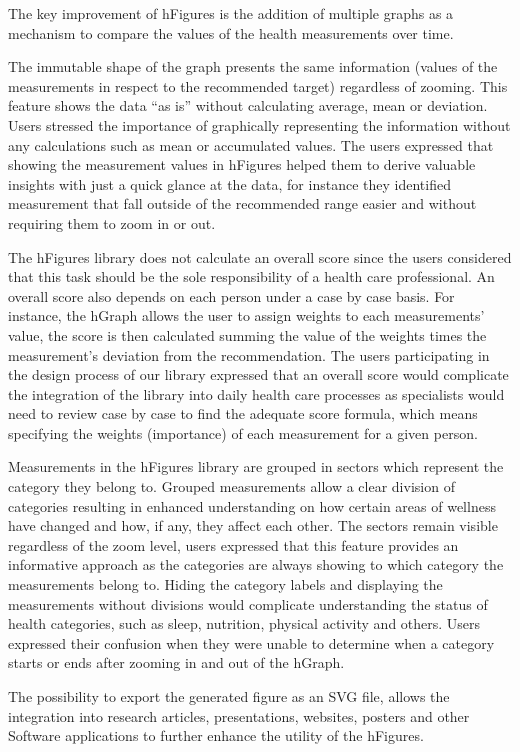 \documentclass[twocolumn]{bmcart}%
\providecommand{\DIFaddend}{} %
\begin{document}
\DIFaddend The key improvement of hFigures is the addition of multiple graphs as a mechanism to compare the values of the health measurements over time.

The immutable shape of the graph presents the same information (values of the measurements in respect to the recommended target) regardless of zooming. This feature shows the data ``as is'' without calculating average, mean or deviation. Users stressed the importance of graphically representing the information without any calculations such as mean or accumulated values. The users expressed that showing the measurement values in hFigures helped them to derive valuable insights with just a quick glance at the data, for instance they identified measurement that fall outside of the recommended range easier and without requiring them to zoom in or out.

The hFigures library does not calculate an overall score since the users considered that this task should be the sole responsibility of a health care professional. An overall score also depends on each person under a case by case basis. For instance, the hGraph allows the user to assign weights to each measurements' value, the score is then calculated summing the value of the weights times the measurement's deviation from the recommendation. The users participating in the design process of our library expressed that an overall score would complicate the integration of the library into daily health care processes as specialists would need to review case by case to find the adequate score formula, which means specifying the weights (importance) of each measurement for a given person.

Measurements in the hFigures library are grouped in sectors which represent the category they belong to. Grouped measurements allow a clear division of categories resulting in enhanced understanding on how certain areas of wellness have changed and how, if any, they affect each other. The sectors remain visible regardless of the zoom level, users expressed that this feature provides an informative approach as the categories are always showing to which category the measurements belong to. Hiding the category labels and displaying the measurements without divisions would complicate understanding the status of health categories, such as sleep, nutrition, physical activity and others. Users expressed their confusion when they were unable to determine when a category starts or ends after zooming in and out of the hGraph.

The possibility to export the generated figure as an SVG file, allows the integration into research articles, presentations, websites, posters and other Software applications to further enhance the utility of the hFigures.
\end{document}
